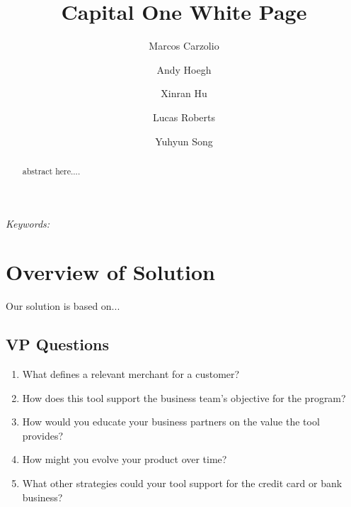\documentclass[12pt]{article} %
\begin{document}
\def\spacingset#1{\renewcommand{\baselinestretch}%
{#1}\small\normalsize} \spacingset{1}




  \title{\bf Capital One White Page}
  \author[1]{Marcos Carzolio}
  \author[1]{Andy Hoegh}
  \author[1]{Xinran Hu}
  \author[1]{Lucas Roberts}
  \author[1]{Yuhyun Song}
 \maketitle

\bigskip
\begin{abstract}
\noindent
abstract here....
\end{abstract}

\noindent%
{\it Keywords:} 
\vfill

\newpage


\newcommand{\ac}[1]{[{\color{red}\ Andy Says: {\tt #1}}]}
\newcommand{\xc}[1]{[{\color{red}\ Xinran Says: {\tt #1}}]}
\newcommand{\lc}[1]{[{\color{red}\ Lucas Says: {\tt #1}}]}
\newcommand{\mc}[1]{[{\color{red}\ Marcos Says: {\tt #1}}]}
\newcommand{\yc}[1]{[{\color{red}\ Yuhyun Says: {\tt #1}}]}

\section{Overview of Solution} 
Our solution is based on...
\subsection{VP Questions}
\begin{enumerate}
\item What defines a relevant merchant for a customer?
\item How does this tool support the business team's objective for the program?
\item How would you educate your business partners on the value the tool provides?
\item How might you evolve your product over time?
\item What other strategies could your tool support for the credit card or bank business?
\end{enumerate}
\end{document}
